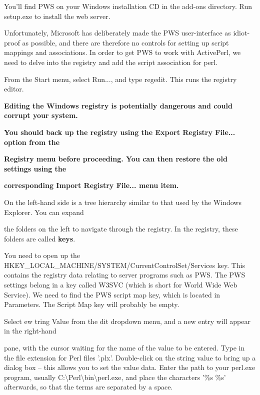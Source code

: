 \documentclass[a4paper,11pt]{book}
\begin{document}
\noindent You'll find PWS on your Windows installation CD in the add-ons directory. Run setup.exe to install the web server.

\noindent 

\noindent Unfortunately, Microsoft has deliberately made the PWS user-interface as idiot-proof as possible, and there are therefore no controls for setting up script mappings and associations. In order to get PWS to work with ActivePerl, we need to delve into the registry and add the script association for perl.

\noindent 

\noindent From the Start menu, select Run..., and type regedit. This runs the registry editor.

\noindent 

\noindent 

\noindent \textbf{Editing the Windows registry is potentially dangerous and could corrupt your system.}

\noindent \textbf{You should back up the registry using the Export Registry File... option from the}

\noindent \textbf{Registry menu before proceeding. You can then restore the old settings using the}

\noindent \textbf{corresponding Import Registry File... menu item.}

\noindent 

\noindent 

\noindent On the left-hand side is a tree hierarchy similar to that used by the Windows Explorer. You can expand

\noindent the folders on the left to navigate through the registry. In the registry, these folders are called \textbf{keys}.

\noindent 

\noindent You need to open up the HKEY\_LOCAL\_MACHINE/SYSTEM/CurrentControlSet/Services key. This contains the registry data relating to server programs such as PWS. The PWS settings belong in a key called W3SVC (which is short for World Wide Web Service). We need to find the PWS script map key, which is located in Parameters. The Script Map key will probably be empty.

\noindent 

\noindent 

\noindent Select ew \textbar  {}tring Value from the dit dropdown menu, and a new entry will appear in the right-hand

\noindent pane, with the cursor waiting for the name of the value to be entered. Type in the file extension for Perl files '.plx'. Double-click on the string value to bring up a dialog box -- this allows you to set the value data. Enter the path to your perl.exe program, usually C:\textbackslash Perl\textbackslash bin\textbackslash perl.exe, and place the characters '\%s \%s' afterwards, so that the terms are separated by a space.
\end{document}
